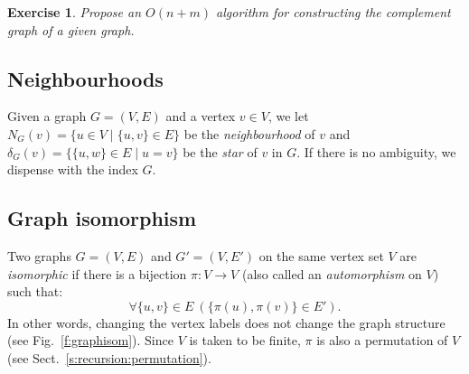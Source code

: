 \documentclass[a4paper]{book}
\theoremstyle{changebreak}                %
\newtheorem{ex}[result]{Exercise}
\begin{document}
\begin{ex}
Propose an $O(n+m)$ algorithm for constructing the complement graph of a given
graph.
\label{ex:complement}
\end{ex}

\subsection{Neighbourhoods}
Given a graph $G=(V,E)$ and a vertex $v\in V$, we let $N_G(v)=\{u\in
V\;|\;\{u,v\}\in E\}$ be the {\it neighbourhood}
of $v$ and $\delta_G(v)=\{\{u,w\}\in E\;|\;u=v\}$ be the {\it
  star} of $v$ in $G$. If there is no ambiguity, we
dispense with the index $G$.

\subsection{Graph isomorphism}
Two graphs $G=(V,E)$ and $G'=(V,E')$ on the same vertex
set $V$ are {\it
  isomorphic} if there is a
bijection $\pi:V\to V$ (also called an {\it
  automorphism} on $V$) such that:
\begin{equation*}
 \forall \{u,v\}\in E \ (\{\pi(u),\pi(v)\}\in E').
\end{equation*}
In other words, changing the vertex labels does
not change the graph structure (see
Fig.~\ref{f:graphisom}). Since $V$ is taken to
be finite, $\pi$ is also a permutation of $V$ (see
Sect.~\ref{s:recursion:permutation}).
\end{document}
